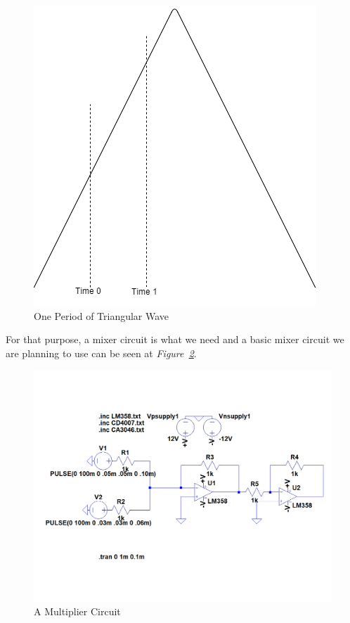 \documentclass[paper]{IEEEtran}
\begin{document}
\begin{figure}[h!]
\setlength{\unitlength}{\textwidth}
\center 
\includegraphics[width=0.25\unitlength]{triangular.png}
\caption{\label{fig:trimix} One Period of Triangular Wave }
\end{figure}	

	
	For that purpose, a mixer circuit is what we need and a basic mixer circuit we are planning to use can be seen at \textit{Figure~\ref{fig:mixer}}.
	
\begin{figure}[h!]
\setlength{\unitlength}{\textwidth}
\center 
\includegraphics[width=0.5\unitlength]{mixerv1.png}
\caption{\label{fig:mixer} A Multiplier Circuit }
\end{figure}	
\end{document}
